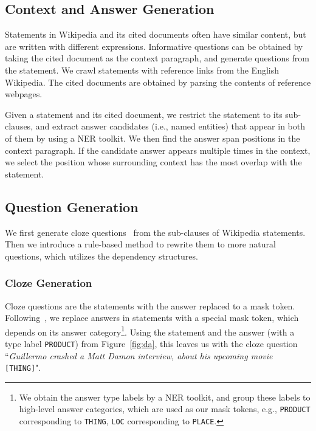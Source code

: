 \documentclass[11pt,a4paper]{article}
\begin{document}
\subsection{Context and Answer Generation}
Statements in Wikipedia and its cited documents often have similar content, but are written with different expressions.
Informative questions can be obtained by taking the cited document as the context paragraph, and generate questions from the statement.
We crawl statements with reference links from the English Wikipedia.
The cited documents are obtained by parsing the contents of reference webpages.







Given a statement and its cited document, we restrict the statement to its sub-clauses, and extract answer candidates (i.e., named entities) that appear in both of them by using a NER toolkit.
We then find the answer span positions in the context paragraph. If the candidate answer appears multiple times in the context, we select the position whose surrounding context has the most overlap with the statement.



\subsection{Question Generation}
\label{ssec:qg_section}

We first generate cloze questions~\cite{lewis2019unsupervisedqa} from the sub-clauses of Wikipedia statements.
Then we introduce a rule-based method to rewrite them to more natural questions, which utilizes the dependency structures.


\subsubsection{Cloze Generation}
Cloze questions are the statements with the answer replaced to a mask token.
Following~\citet{lewis2019unsupervisedqa}, we replace answers in statements with a special mask token, which depends on its answer category\footnote{We obtain the answer type labels by a NER toolkit, and group these labels to high-level answer categories, which are used as our mask tokens, e.g., \texttt{PRODUCT} corresponding to \texttt{THING}, \texttt{LOC} corresponding to \texttt{PLACE}.}.
Using the statement and the answer (with a type label \texttt{PRODUCT}) from Figure~\ref{fig:da}, this leaves us with the cloze question ``\textit{Guillermo crashed a Matt Damon interview, about his upcoming movie }\texttt{[THING]}".
\end{document}

